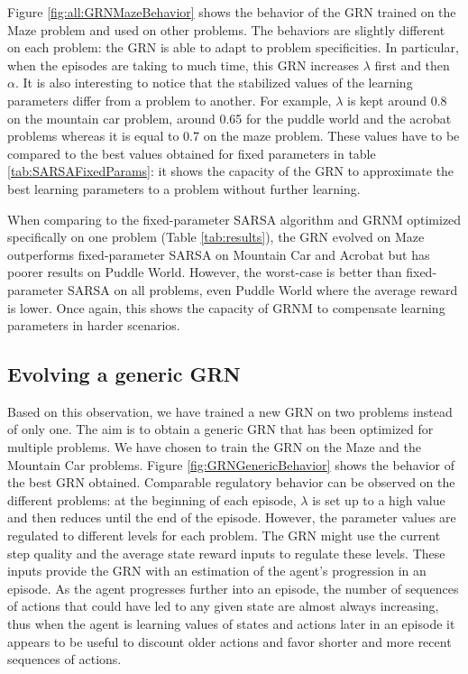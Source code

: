 Figure \ref{fig:all:GRNMazeBehavior} shows the behavior of the GRN trained on the Maze problem and used on other problems. The behaviors are slightly different on each problem: the GRN is able to adapt to problem specificities. In particular, when the episodes are taking to much time, this GRN increases $\lambda$ first and then $\alpha$. It is also interesting to notice that the stabilized values of the learning parameters differ from a problem to another. For example, $\lambda$ is kept around 0.8 on the mountain car problem, around 0.65 for the puddle world and the acrobat problems whereas it is equal to 0.7 on the maze problem. These values have to be compared to the best values obtained for fixed parameters in table \ref{tab:SARSAFixedParams}: it shows the capacity of the GRN to approximate the best learning parameters to a problem without further learning.

When comparing to the fixed-parameter SARSA algorithm and GRNM optimized specifically on one problem (Table \ref{tab:results}), the GRN evolved on Maze outperforms fixed-parameter SARSA on Mountain Car and Acrobat but has poorer results on Puddle World. However, the worst-case is better than fixed-parameter SARSA on all problems, even Puddle World where the average reward is lower. Once again, this shows the capacity of GRNM to compensate learning parameters in harder scenarios.

\subsection{Evolving a generic GRN}
Based on this observation, we have trained a new GRN on two problems instead of only one. The aim is to obtain a generic GRN that has been optimized for multiple problems. We have chosen to train the GRN on the Maze and the Mountain Car problems. Figure \ref{fig:GRNGenericBehavior} shows the behavior of the best GRN obtained. Comparable regulatory behavior can be observed on the different problems: at the beginning of each episode, $\lambda$ is set up to a high value and then reduces until the end of the episode. However, the parameter values are regulated to different levels for each problem. The GRN might use the current step quality and the average state reward inputs to regulate these levels. These inputs provide the GRN with an estimation of the agent's progression in an episode. As the agent progresses further into an episode, the number of sequences of actions that could have led to any given state are almost always increasing, thus when the agent is learning values of states and actions later in an episode it appears to be useful to discount older actions and favor shorter and more recent sequences of actions.

